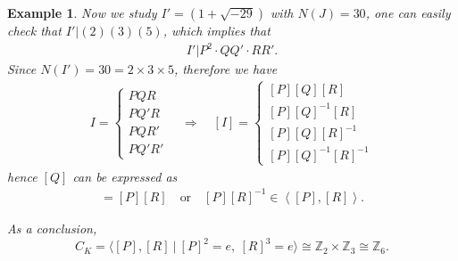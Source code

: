 \documentclass[11pt]{book}
\newtheorem{example}[theorem]{Example}
\begin{document}
\begin{example}
\medskip
Now we study \(I' = (1+\sqrt{-29})\) with \(N(J) = 30\), one can easily check that \(I' | (2)(3)(5)\), which implies that 
\begin{align*}
    I' | P^2\cdot Q Q'  \cdot RR'.
\end{align*}
Since \(N(I') = 30 = 2\times3 \times 5\), therefore we have
\begin{align*}
    I = \left\{\begin{matrix}
PQR \\
PQ'R \\
PQR' \\
PQ'R'
\end{matrix}\right. \quad \Rightarrow \quad [I] = \left\{\begin{matrix}
[P][Q][R] \\
[P][Q]^{-1}[R] \\
[P][Q][R]^{-1} \\
[P][Q]^{-1}[R]^{-1}
\end{matrix}\right.
\end{align*}
hence \([Q]\) can be expressed as
\begin{align*}
    [Q] =  [P][R] \quad \text{or}\quad [P][R]^{-1} \in \left<[P] ,[R]\right>.
\end{align*}

As a conclusion, 
\[C_K = \langle [P],[R]\ |\ [P]^2 = e,\ [R]^3 = e \rangle \cong \mathbb{Z}_2 \times \mathbb{Z}_3 \cong \mathbb{Z}_6.\]
\end{example}
\end{document}
